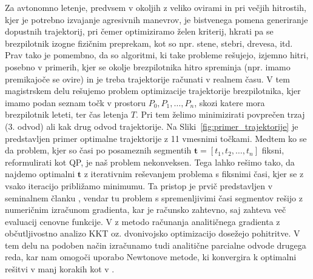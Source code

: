\documentclass[mat2, tisk]{fmfdelo}
\newcommand{\tvec}{\mathbf{t}}
\begin{document}
Za avtonomno letenje, predvsem v okoljih z veliko ovirami in pri večjih hitrostih, kjer je potrebno izvajanje agresivnih manevrov, je bistvenega pomena generiranje dopustnih trajektorij, pri čemer optimiziramo želen kriterij, hkrati pa se brezpilotnik izogne fizičnim preprekam, kot so npr. stene, stebri, drevesa, itd. Prav tako je pomembno, da so algoritmi, ki take probleme rešujejo, izjemno hitri, posebno v primerih, kjer se okolje brezpilotnika hitro spreminja (npr. imamo premikajoče se ovire) in je treba trajektorije računati v realnem času. 
V tem magistrskem delu rešujemo problem optimizacije trajektorije brezpilotnika, kjer imamo podan seznam točk v prostoru $P_0, P_1, \ldots, P_n$, skozi katere mora brezpilotnik leteti, ter čas letenja $T$. Pri tem želimo minimizirati povprečen trzaj (3. odvod) ali kak drug odvod trajektorije. Na Sliki~\ref{fig:primer_trajektorije} je predstavljen primer optimalne trajektorije z 11 vmesnimi točkami. Medtem ko se da problem, kjer so časi po posameznih segmentih $\tvec = \left[ t_1, t_2, \ldots, t_n \right]$ fiksni, reformulirati kot \ac{QP}, je naš problem nekonveksen. Tega lahko rešimo tako, da najdemo optimalni $\tvec$ z iterativnim reševanjem problema s fiksnimi časi, kjer se z vsako iteracijo približamo minimumu. Ta pristop je prvič predstavljen v seminalnem članku \cite{mellinger2011minimum}, vendar tu problem s spremenljivimi časi segmentov rešijo z numeričnim izračunom gradienta, kar je računsko zahtevno, saj zahteva več evaluacij cenovne funkcije. V \cite{sun2021fast} z metodo računanja analitičnega gradienta z občutljivostno analizo \ac{KKT} oz. dvonivojsko optimizacijo dosežejo pohitritve. V tem delu na podoben način izračunamo tudi analitične parcialne odvode drugega reda, kar nam omogoči uporabo Newtonove metode, ki konvergira k optimalni rešitvi v manj korakih kot v \cite{sun2021fast}.
\end{document}
